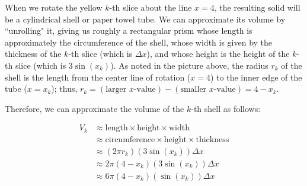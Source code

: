 \documentclass[main]{subfiles}
\begin{document}
\begin{enumerate}
\begin{enumerate}
\begin{enumerate}
\begin{solution}
\begin{center}
\end{center}

When we rotate the yellow $k$-th slice about the line $x=4$, the resulting solid will be a $\boxed{\text{cylindrical shell}}$ or $\boxed{\text{paper towel tube}}$. We can approximate its volume by ``unrolling" it, giving us roughly a rectangular prism whose length is approximately the circumference of the shell, whose width is given by the thickness of the $k$-th slice (which is $\Delta x$), and whose height is the height of the $k$-th slice (which is $3\sin(x_k)$). As noted in the picture above, the radius $r_k$ of the shell is the length from the center line of rotation ($x=4$) to the inner edge of the tube ($x=x_k$); thus, $r_k=(\text{larger $x$-value})-(\text{smaller $x$-value})=4-x_k$. 

Therefore, we can approximate the volume of the $k$-th shell as follows:

\begin{align*}
V_k & \approx \text{length}\times\text{height} \times \text{width}\\
& \approx \text{circumference}\times \text{height}\times\text{thickness}\\
& \approx (2\pi r_k)(3\sin(x_k))\Delta x\\
& \approx 2\pi(4-x_k)(3\sin(x_k))\Delta x\\
& \approx \boxed{6\pi(4-x_k)(\sin(x_k))\Delta x}\\
\end{align*}


\end{solution}
\end{enumerate}
\end{enumerate}
\end{enumerate}
\end{document}
